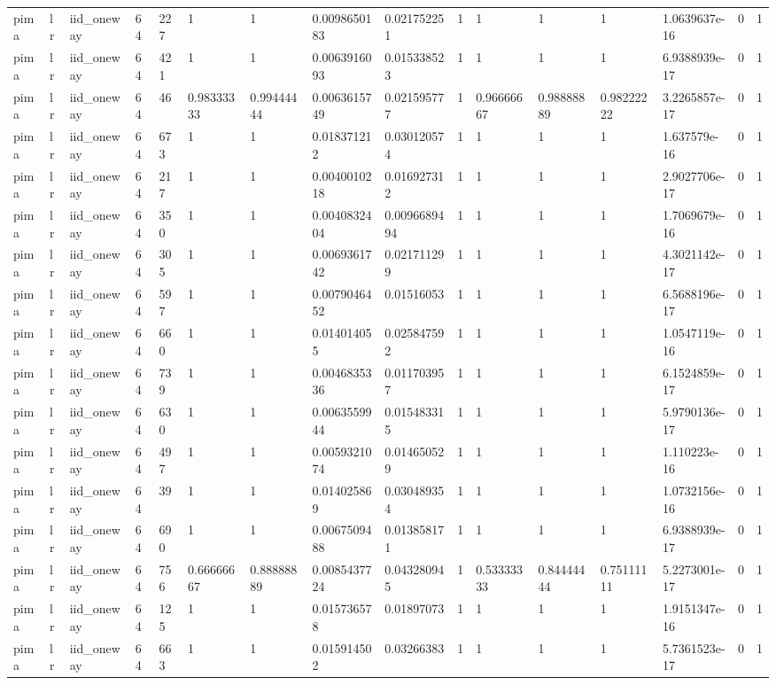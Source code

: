 \begin{tabular}{llllllllllllllll}
pima & lr & iid\_oneway & 64 & 227 & 1 & 1 & 0.0098650183 & 0.021752251 & 1 & 1 & 1 & 1 & 1.0639637e-16 & 0 & 1 \\
pima & lr & iid\_oneway & 64 & 421 & 1 & 1 & 0.0063916093 & 0.015338523 & 1 & 1 & 1 & 1 & 6.9388939e-17 & 0 & 1 \\
pima & lr & iid\_oneway & 64 & 46 & 0.98333333 & 0.99444444 & 0.0063615749 & 0.021595777 & 1 & 0.96666667 & 0.98888889 & 0.98222222 & 3.2265857e-17 & 0 & 1 \\
pima & lr & iid\_oneway & 64 & 673 & 1 & 1 & 0.018371212 & 0.030120574 & 1 & 1 & 1 & 1 & 1.637579e-16 & 0 & 1 \\
pima & lr & iid\_oneway & 64 & 217 & 1 & 1 & 0.0040010218 & 0.016927312 & 1 & 1 & 1 & 1 & 2.9027706e-17 & 0 & 1 \\
pima & lr & iid\_oneway & 64 & 350 & 1 & 1 & 0.0040832404 & 0.0096689494 & 1 & 1 & 1 & 1 & 1.7069679e-16 & 0 & 1 \\
pima & lr & iid\_oneway & 64 & 305 & 1 & 1 & 0.0069361742 & 0.021711299 & 1 & 1 & 1 & 1 & 4.3021142e-17 & 0 & 1 \\
pima & lr & iid\_oneway & 64 & 597 & 1 & 1 & 0.0079046452 & 0.01516053 & 1 & 1 & 1 & 1 & 6.5688196e-17 & 0 & 1 \\
pima & lr & iid\_oneway & 64 & 660 & 1 & 1 & 0.014014055 & 0.025847592 & 1 & 1 & 1 & 1 & 1.0547119e-16 & 0 & 1 \\
pima & lr & iid\_oneway & 64 & 739 & 1 & 1 & 0.0046835336 & 0.011703957 & 1 & 1 & 1 & 1 & 6.1524859e-17 & 0 & 1 \\
pima & lr & iid\_oneway & 64 & 630 & 1 & 1 & 0.0063559944 & 0.015483315 & 1 & 1 & 1 & 1 & 5.9790136e-17 & 0 & 1 \\
pima & lr & iid\_oneway & 64 & 497 & 1 & 1 & 0.0059321074 & 0.014650529 & 1 & 1 & 1 & 1 & 1.110223e-16 & 0 & 1 \\
pima & lr & iid\_oneway & 64 & 39 & 1 & 1 & 0.014025869 & 0.030489354 & 1 & 1 & 1 & 1 & 1.0732156e-16 & 0 & 1 \\
pima & lr & iid\_oneway & 64 & 690 & 1 & 1 & 0.0067509488 & 0.013858171 & 1 & 1 & 1 & 1 & 6.9388939e-17 & 0 & 1 \\
pima & lr & iid\_oneway & 64 & 756 & 0.66666667 & 0.88888889 & 0.0085437724 & 0.043280945 & 1 & 0.53333333 & 0.84444444 & 0.75111111 & 5.2273001e-17 & 0 & 1 \\
pima & lr & iid\_oneway & 64 & 125 & 1 & 1 & 0.015736578 & 0.01897073 & 1 & 1 & 1 & 1 & 1.9151347e-16 & 0 & 1 \\
pima & lr & iid\_oneway & 64 & 663 & 1 & 1 & 0.015914502 & 0.03266383 & 1 & 1 & 1 & 1 & 5.7361523e-17 & 0 & 1 \\

\end{tabular}
